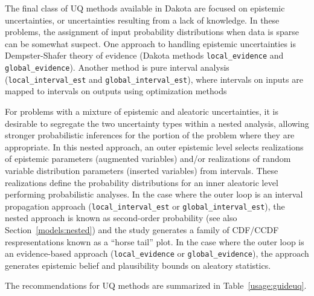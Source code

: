 The final class of UQ methods available in Dakota are focused on
epistemic uncertainties, or uncertainties resulting from a lack of
knowledge.  In these problems, the assignment of input probability
distributions when data is sparse can be somewhat suspect.  One
approach to handling epistemic uncertainties is Dempster-Shafer theory
of evidence (Dakota methods \texttt{local\_evidence} and 
\texttt{global\_evidence}). Another method is pure interval 
analysis (\texttt{local\_interval\_est} and 
\texttt{global\_interval\_est}), where intervals on inputs are 
mapped to intervals on outputs using optimization methods 

For problems with a mixture of epistemic and aleatoric uncertainties, 
it is desirable to segregate the two uncertainty types within a nested 
analysis, allowing stronger probabilistic inferences for the portion
of the problem where they are appropriate.  In this nested approach, an outer 
epistemic level selects realizations of epistemic parameters (augmented
variables) and/or realizations of random variable distribution
parameters (inserted variables) from intervals.  These realizations
define the probability distributions for an inner aleatoric level
performing probabilistic analyses.  In the case where the outer loop
is an interval propagation approach (\texttt{local\_interval\_est} or 
\texttt{global\_interval\_est}), the nested approach is
known as second-order probability (see also Section~\ref{models:nested})
and the study generates a family of CDF/CCDF respresentations known as a 
``horse tail'' plot.  In the case where the outer loop is an 
evidence-based approach (\texttt{local\_evidence} or 
\texttt{global\_evidence}), the approach generates epistemic belief 
and plausibility bounds on aleatory statistics.

The recommendations for UQ methods are summarized in Table~\ref{usage:guideuq}.

